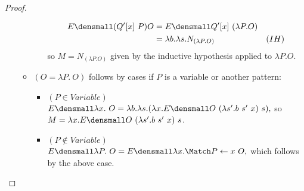 \begin{proof}
\begin{enumerate}[(a)]
\begin{itemize}
\begin{itemize}
\begin{align*}
          E\den{(Q'[x] ~ P) O}
          &=
          E\den{Q'[x] ~ (\lambda P. O)}
          \\
          &=
          \lambda b. \lambda s. N_{(\lambda P. O)}
          &(IH)
        \end{align*}
        so $M = N_{(\lambda P. O)}$ given by the inductive hypothesis applied to $\lambda P. O$.
      \end{itemize}
    \item $(O = \lambda P. ~O)$ follows by cases if $P$ is a variable or another pattern:
      \begin{itemize}
      \item $(P \in \mathit{Variable})$
        \begin{math}
          E\den{\lambda x. ~O}
          =
          \lambda b. \lambda s.
          (\lambda x. E\den{O} ~ (\lambda s'. b ~ s' ~ x) ~ s)
          ,
        \end{math}
        so
        \\
        $M = \lambda x. E\den{O} ~ (\lambda s'. b ~ s' ~ x) ~ s$.
      \item $(P \notin \mathit{Variable})$
      \begin{math}
        E\den{\lambda P. ~O}
        =
        E\den{\lambda x. \Match P \gets x ~ O}
        ,
      \end{math}
      which follows by the above case.
      \end{itemize}

\end{itemize}
\end{enumerate}
\end{proof}
